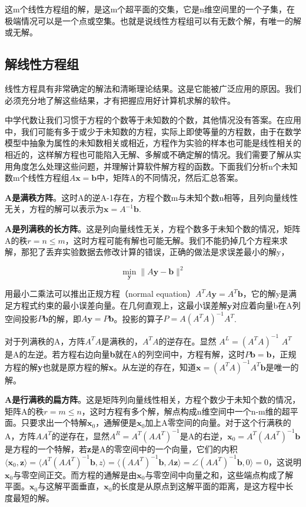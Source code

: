 这m个线性方程组的解，是这m个超平面的交集，它是n维空间里的一个子集，在极端情况可以是一个点或空集。也就是说线性方程组可以有无数个解，有唯一的解或无解。

\subsection{解线性方程组}

线性方程具有非常确定的解法和清晰理论结果。这是它能被广泛应用的原因。我们必须充分地了解这些结果，才有把握应用好计算机求解的软件。

中学代数让我们习惯于方程的个数等于未知数的个数，其他情况没有答案。在应用中，我们可能有多于或少于未知数的方程，实际上即使等量的方程数，由于在数学模型中抽象为属性的未知数相关或相近，方程作为实验的样本也可能是线性相关的相近的，这样解方程也可能陷入无解、多解或不确定解的情况。我们需要了解从实用角度怎么处理这些问题，并理解计算软件解方程的函数。下面我们分析n个未知数m个线性方程组$ A\bm{x}=\bm{b} $中，矩阵A的不同情况，然后汇总答案。

\textbf{A是满秩方阵}。这时A的逆A-1存在，方程个数m与未知个数n相等，且列向量线性无关，方程的解可以表示为$ \bm{x}=A^{-1}\bm{b} $.

\textbf{A是列满秩的长方阵}。这是列向量线性无关，方程个数多于未知个数的情况，矩阵A的秩$ r = n \le m $，这时方程可能有解也可能无解。我们不能扔掉几个方程来求解，那犯了丢弃实验数据去修改计算的错误，正确的做法是求误差最小的解y，

\[\min_\textbf{y}\|A\textbf{y}-\textbf{b}\|^2\]

用最小二乘法可以推出正规方程（normal equation）$ A^TA\bm{y}=A^T\bm{b} $，它的解y是满足方程式约束的最小误差向量。在几何直观上，这最小误差解$ \bm{y} $对应着向量b在A列空间投影$ P\bm{b} $的解，即$ A\bm{y} = P\bm{b} $。投影的算子$ P=A (A^TA)^{-1}A^T $. 

对于列满秩的A，方阵$ A^TA $是满秩的，$ A^TA $的逆存在。显然 $ A^L=(A^TA)^{-1}$  $A^T $ 是A的左逆。若方程右边向量\textbf{b}就在A的列空间中，方程有解，这时$ P\bm{b}=\bm{b} $，正规方程的解\textbf{y}也就是原方程的解\textbf{x}。从左逆的存在，知道$ \bm{x}=(A^TA)^{-1}A^T\bm{b} $是唯一的解。

\textbf{A是行满秩的扁方阵}。这是矩阵列向量线性相关，方程个数少于未知个数的情况，矩阵A的秩$ r =m \le n $，这时方程有多个解，解点构成n维空间中一个n-m维的超平面。只要求出一个特解$ \bm{x}_0 $，通解便是$ \bm{x}_0 $加上A零空间的向量。对于这个行满秩的A，方阵$ AA^T $的逆存在，显然$ A^R=A^T(AA^T)^{-1} $是A的右逆，$ \bm{x}_0= A^T(AA^T)^{-1}\bm{b} $是方程的一个特解，若\textbf{z}是A的零空间中的一个向量，它们的内积$ \langle \bm{x}_0, \bm{z}\rangle=\langle A^T(AA^T)^{-1}\bm{b}, z\rangle =\langle(AA^T)^{-1}\bm{b}, A\bm{z}\rangle=\angle(AA^T)^{-1}\bm{b}, 0\rangle= 0 $，这说明$ \bm{x}_0 $与零空间正交。而方程的通解是由$ \bm{x}_0 $与零空间中向量之和，这些端点构成了解平面。$ \bm{x}_0 $与这解平面垂直，$ \bm{x}_0 $的长度是从原点到这解平面的距离，是这方程中长度最短的解。

